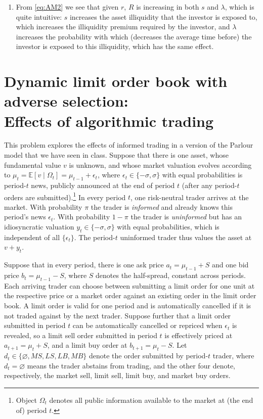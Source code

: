 \documentclass[a4paper]{article}
\begin{document}
\begin{enumerate}
	\item From \eqref{eq:AM2} we see that given $r$, $R$ is increasing in both $s$ and $\lambda$, which is quite intuitive: $s$ increases the asset illiquidity that the investor is exposed to, which increases the illiquidity premium required by the investor, and $\lambda$ increases the probability with which (decreases the average time before) the investor is exposed to this illiquidity, which has the same effect.
\end{enumerate}
\fi





\section{Dynamic limit order book with adverse selection: \\Effects of algorithmic trading}
	This problem explores the effects of informed trading in a version of the Parlour model that we have seen in class.
	Suppose that there is one asset, whose fundamental value $v$ is unknown, and whose market valuation evolves according to $\mu_t = \mathbb{E}[v \mid \Omega_t] = \mu_{t-1} + \epsilon_t$, where $\epsilon_t \in \{-\sigma, \sigma\}$ with equal probabilities is period-$t$ news, publicly announced at the end of period $t$ (after any period-$t$ orders are submitted).\footnote{Object $\Omega_t$ denotes all public information available to the market at (the end of) period $t$.} 
	In every period $t$, one risk-neutral trader arrives at the market. With probability $\pi$ the trader is \emph{informed} and already knows this period's news $\epsilon_t$. With probability $1-\pi$ the trader is \emph{uninformed} but has an idiosyncratic valuation $y_t \in \{-\sigma, \sigma\}$ with equal probabilities, which is independent of all $\{\epsilon_t\}$. The period-$t$ uninformed trader thus values the asset at $v+y_t$.
	
	Suppose that in every period, there is one ask price $a_t = \mu_{t-1} + S$ and one bid price $b_t = \mu_{t-1} - S$, where $S$ denotes the half-spread, constant across periods. Each arriving trader can choose between submitting a limit order for one unit at the respective price or a market order against an existing order in the limit order book. A limit order is valid for one period and is automatically cancelled if it is not traded against by the next trader. 
	Suppose further that a limit order submitted in period $t$ can be automatically cancelled or repriced when $\epsilon_t$ is revealed, so a limit sell order submitted in period $t$ is effectively priced at $a_{t+1} = \mu_t + S$, and a limit buy order at $b_{t+1} = \mu_t - S$. 
	Let $d_t \in \{\varnothing,MS,LS,LB,MB\}$ denote the order submitted by period-$t$ trader, where $d_t = \varnothing$ means the trader abstains from trading, and the other four denote, respectively, the market sell, limit sell, limit buy, and market buy orders.
	
\end{document}
